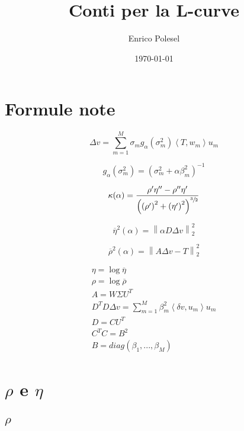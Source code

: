 \documentclass[a4paper,10pt]{article}
\title{Conti per la L-curve}
\author{Enrico Polesel}
\date{\today}
\theoremstyle{plain}
\theoremstyle{definition}
\theoremstyle{remark}
\newcommand{\obar}[1]{\overline{#1}}
\newcommand{\pa}[1]{\left(#1\right)}
\newcommand{\ang}[1]{\left<#1\right>}
\newcommand{\norm}[1]{\left\|#1\right\|}
\begin{document}
\maketitle

\section{Formule note}

\begin{equation}
  \Delta v = \sum _{m=1} ^M \sigma _m g_\alpha \pa{\sigma_m ^2 }
  \ang{T,w_m} u_m
\end{equation}

\begin{equation}
  g_\alpha \pa{\sigma_m ^2 } = \pa{ \sigma _m ^2 + \alpha \beta _m ^2
  } ^ {-1}
\end{equation}

\begin{equation}
  \kappa (\alpha) = \frac{ \rho ' \eta ''  - \rho '' \eta '}{
    \pa{\pa{\rho ' } ^2 + \pa{ \eta ' } ^2 } ^ {\sfrac{3}{2}}}
\end{equation}

\begin{equation}
  \obar{\eta} ^2 (\alpha) = \norm{ \alpha D \Delta v } _2 ^2
\end{equation}

\begin{equation}
  \obar{\rho} ^2 (\alpha) = \norm{ A \Delta v - T}_2 ^2
\end{equation}

\begin{align*}
  \eta = \log \obar{\eta} \\
  \rho = \log \obar{\rho} \\
  A = W \Sigma U ^T \\
  D^T D \Delta v = \sum _{m=1} ^ M \beta _m ^2 \ang{ \delta v , u_m }
  u_m \\
  D = C U^T \\ 
  C^T C = B ^2 \\
  B = diag( \beta _1 , ... , \beta _M) 
\end{align*}


\section{$\rho$ e $\eta$}

\subsection{$\rho$}
\end{document}
